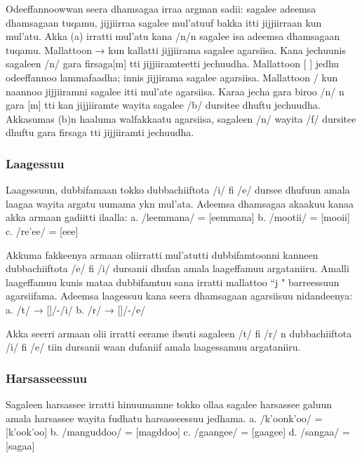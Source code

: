 \documentclass[11pt,b5paper]{book}
\begin{document}
\begin{itemize}
Odeeffannoowwan seera dhamsagaa irraa argman sadii:  sagalee adeemsa dhamsagaan tuqamu, jijjiirraa sagalee  mul'atuuf bakka itti jijjiirraan kun mul'atu. Akka (a) irratti  mul'atu kana /n/n sagalee isa adeemsa dhamsagaan tuqamu.  Mallattoon → kun kallatti jijjiirama sagalee agarsiisa. Kana  jechuunis sagaleen /n/ gara firsaga[m] tti jijjiiramteetti jechuudha. Mallattoon [ ] jedhu odeeffannoo lammafaadha;  innis jijjirama sagalee agarsiisa. Mallattoon / kun naannoo  jijjiiramni sagalee itti mul'ate agarsiisa. Karaa jecha gara  biroo /n/ n gara [m] tti kan jijjiiramte wayita sagalee /b/  dursitee dhuftu jechuudha. Akkasumas (b)n haaluma walfakkaatu agarsiisa, sagaleen /n/ wayita /f/ dursitee dhuftu  gara firsaga \textipa{[M]}tti jijjiiramti jechuudha.

\subsubsection{Laagessuu}

Laagessuun, dubbifamaan tokko dubbachiiftota /i/ fi /e/  dursee dhufuun amala laagaa wayita argatu uumama ykn  mul'ata. Adeemsa dhamsagaa akaakuu kanaa akka armaan  gadiitti ilaalla:\newline
a. /leemmana/ = [eemmana]  \newline
b. /mootii/ = [mooii]  \newline
c. /re’ee/ = [eee]  

Akkuma fakkeenya armaan oliirratti mul'atutti dubbifamtoonni  kanneen dubbachiiftota /e/ fi /i/ dursanii dhufan amala  laageffamuu argataniiru. Amalli laageffamuu kunis mataa  dubbifamtuu sana irratti mallattoo “{\super j} " barreessuun  agarsiifama. Adeemsa laagessuu kana seera dhamsagaan  agarsiisuu nidandeenya:  \newline
a. /t/ → []/-/i/  \newline
b. /r/ → []/-/e/  


Akka seerri armaan olii irratti eerame ibsuti sagaleen /t/ fi /r/ n dubbachiiftota /i/ fi /e/ tiin dursanii waan dufaniif amala  laagessamuu argataniiru.

\subsubsection{Harsasseessuu}

Sagaleen harsassee irratti hinuumamne tokko ollaa sagalee  harsassee galuun amala harsassee wayita fudhatu  harsasseessuu jedhama. \newline
a. /k'oonk'oo/ = [k’ook’oo]  \newline
b. /manguddoo/ = [magddoo]  \newline
c. /gaangee/ = [gaagee] \newline
d. /sangaa/ = [sagaa] 


\end{itemize}
\end{document}
